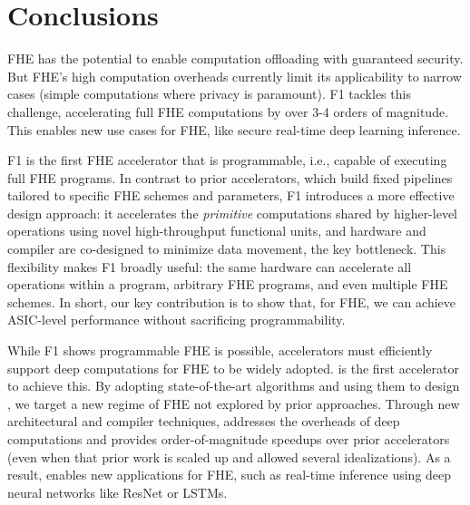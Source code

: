 \chapter{Conclusions}\label{sec:conclusion}

FHE has the potential to enable computation offloading with guaranteed
security. But FHE's high computation overheads currently limit its
applicability to narrow cases (simple computations where privacy is paramount).
F1 tackles this challenge, accelerating full FHE computations by over 3-4
orders of magnitude. This enables new use cases for FHE, like secure real-time
deep learning inference.

F1 is the first FHE accelerator that is programmable, i.e., capable of
executing full FHE programs. In contrast to prior accelerators, which build
fixed pipelines tailored to specific FHE schemes and parameters, F1 introduces
a more effective design approach: it accelerates the \emph{primitive}
computations shared by higher-level operations using novel high\hyp{}throughput
functional units, and hardware and compiler are co-designed to minimize data
movement, the key bottleneck. This flexibility makes F1 broadly useful: the
same hardware can accelerate all operations within a program, arbitrary FHE
programs, and even multiple FHE schemes. In short, our key contribution is to
show that, for FHE, we can achieve ASIC-level performance without sacrificing
programmability.

While F1 shows programmable FHE is possible, accelerators must efficiently
support deep computations for FHE to be widely adopted. \name is the first
accelerator to achieve this. By adopting state-of-the-art algorithms and using
them to design \name, we target a new regime of FHE not explored by prior
approaches. Through new architectural and compiler techniques, \name addresses
the overheads of deep computations and provides order-of-magnitude speedups
over prior accelerators (even when that prior work is scaled up and allowed
several idealizations). As a result, \name enables new applications for FHE,
such as real-time inference using deep neural networks like ResNet or LSTMs.

